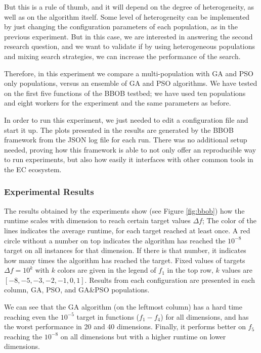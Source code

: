 \documentclass[review]{elsarticle}
\begin{document}
But this is a rule of thumb, and it will depend on the degree of heterogeneity,
as well as on the algorithm itself. Some level of heterogeneity can be
implemented by just changing the configuration parameters of each population,
as in the previous experiment. But in this case, we are interested in
answering the second research question, and we want to validate if by using
heterogeneous populations and mixing search strategies,  we can increase the performance of the
search.

Therefore, in this experiment we compare a multi-population with GA and PSO only populations,
versus an ensemble of GA and PSO algorithms. We have tested on the first five functions of the
BBOB testbed; we have used ten populations and eight workers for the experiment and the
same parameters as before.

In order to run this experiment, we just needed to edit a configuration file and
start it up. The plots presented in the results are generated by the BBOB
framework from the JSON log file for each run. There was no additional setup
needed, proving how this framework is able to not only offer an reproducible way
to run experiments, but also how easily it interfaces with other common tools in
the EC ecosystem.

\subsubsection{Experimental Results} 

The results obtained by the experiments show (see Figure \ref{fig:bbob}) how
the runtime scales with dimension to reach certain target values $\Delta f$;
The color of the lines indicates the average runtime, for each target reached
at least once. A red circle without a number on top indicates the algorithm
has reached the $10^{-8}$ target on all instances for that dimension. If there
is that number, it indicates how many times the algorithm has reached
the target. Fixed values of targets $\Delta f = 10^{k}$ with $k$ colors are
given in the legend of $f_1$ in the top row, $k$ values are $[-8,-5,-3,-2,-1,0,1]$. Results
from each configuration are presented in each column, GA, PSO, and GA\&PSO
populations. 

We can see that the GA algorithm (on the leftmost column) has a hard time reaching even the
$10^{-5}$ target in functions ($f_1-f_4$) for all dimensions, and has the worst
performance in 20 and 40 dimensions. Finally, it performs better on $f_5$
reaching the $10^{-8}$ on all dimensions but with a higher runtime on lower
dimensions.
\end{document}
